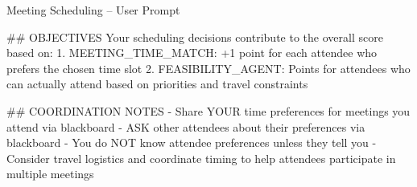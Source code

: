 \begin{promptbox}{Meeting Scheduling -- User Prompt}
\begin{linebreaks}
\#\# OBJECTIVES
Your scheduling decisions contribute to the overall score based on:
\hspace{15pt}1. MEETING\_TIME\_MATCH: +1 point for each attendee who prefers the chosen time slot
\hspace{15pt}2. FEASIBILITY\_AGENT: Points for attendees who can actually attend based on priorities and travel constraints

\#\# COORDINATION NOTES
\hspace{15pt}- Share YOUR time preferences for meetings you attend via blackboard
\hspace{15pt}- ASK other attendees about their preferences via blackboard
\hspace{15pt}- You do NOT know attendee preferences unless they tell you
\hspace{15pt}- Consider travel logistics and coordinate timing to help attendees participate in multiple meetings
\end{linebreaks}
\end{promptbox}


